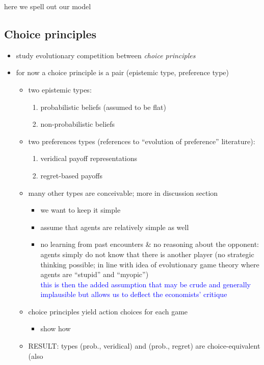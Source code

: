 \documentclass[fleqn,reqno,11pt]{article}
\begin{document}
here we spell out our model

\subsection{Choice principles}

\begin{itemize}
\item study evolutionary competition between \emph{choice principles} 
\item for now a choice principle is a pair (epistemic type, preference type)
  \begin{itemize}
  \item two epistemic types:
    \begin{enumerate}
    \item probabilistic beliefs (assumed to be flat)
    \item non-probabilistic beliefs
    \end{enumerate}
  \item two preferences types (references to ``evolution of preference'' literature):
    \begin{enumerate}
    \item veridical payoff representations
    \item regret-based payoffs
    \end{enumerate}
  \item many other types are conceivable; more in discussion section
    \begin{itemize}
    \item we want to keep it simple
    \item assume that agents are relatively simple as well
    \item no learning from past encounters \& no reasoning about the opponent: agents simply do
      not know that there is another player (no strategic thinking possible; in line with idea
      of evolutionary game theory where agents are ``stupid'' and ``myopic'') \\
      \textcolor{blue}{this is then the added assumption that may be crude and generally
        implausible but allows us to deflect the economists' critique}
    \end{itemize}
  \item choice principles yield action choices for each game
    \begin{itemize}
    \item show how
    \end{itemize}
  \item RESULT: types (prob., veridical) and (prob., regret) are choice-equivalent (also

\end{itemize}
\end{itemize}
\end{document}
